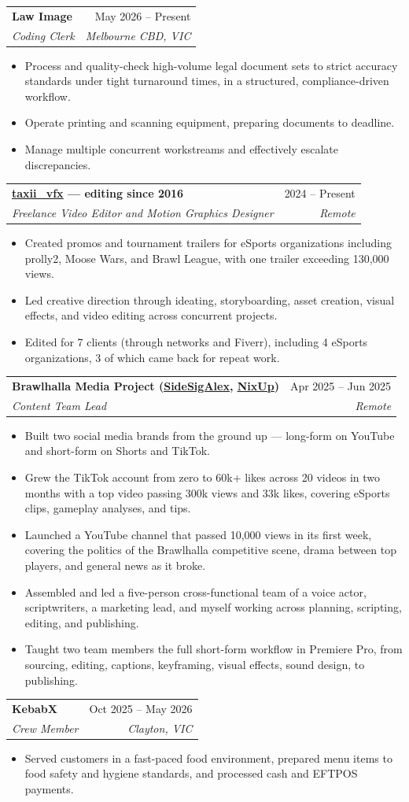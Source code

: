 \documentclass[letterpaper,11pt]{article}
\makeatletter
\newcommand{\resumeItem}[1]{\item\small{{#1 \vspace{-2pt}}}}
\newcommand{\resumeSubheading}[4]{
  \vspace{-2pt}\item
    \begin{tabular*}{0.97\textwidth}[t]{l@{\extracolsep{\fill}}r}
      \textbf{#1} & #2 \\
      \textit{\small#3} & \textit{\small #4} \\
    \end{tabular*}\vspace{-7pt}
}
\newcommand{\resumeItemListStart}{\begin{itemize}}
\newcommand{\resumeItemListEnd}{\end{itemize}\vspace{-5pt}}
\makeatother
\begin{document}
    \resumeSubheading
      {Law Image}{May 2026 -- Present}
      {Coding Clerk}{Melbourne CBD, VIC}
      \resumeItemListStart
        \resumeItem{Process and quality-check high-volume legal document sets to strict accuracy standards under tight turnaround times, in a structured, compliance-driven workflow.}
        \resumeItem{Operate printing and scanning equipment, preparing documents to deadline.}
        \resumeItem{Manage multiple concurrent workstreams and effectively escalate discrepancies.}
      \resumeItemListEnd

    \resumeSubheading
      {\href{http://x.com/taxii_vfx/all}{\underline{taxii\_vfx}} --- editing since 2016}{2024 -- Present}
      {Freelance Video Editor and Motion Graphics Designer}{Remote}
      \resumeItemListStart
        \resumeItem{Created promos and tournament trailers for eSports organizations including prolly2, Moose Wars, and Brawl League, with one trailer exceeding 130,000 views.}
        \resumeItem{Led creative direction through ideating, storyboarding, asset creation, visual effects, and video editing across concurrent projects.}
        \resumeItem{Edited for 7 clients (through networks and Fiverr), including 4 eSports organizations, 3 of which came back for repeat work.}
      \resumeItemListEnd

    \resumeSubheading
      {Brawlhalla Media Project (\href{https://www.tiktok.com/@sidesigalex}{\underline{SideSigAlex}}, \href{https://www.youtube.com/@thenixup}{\underline{NixUp}})}{Apr 2025 -- Jun 2025}
      {Content Team Lead}{Remote}
      \resumeItemListStart
        \resumeItem{Built two social media brands from the ground up --- long-form on YouTube and short-form on Shorts and TikTok.}
        \resumeItem{Grew the TikTok account from zero to 60k+ likes across 20 videos in two months with a top video passing 300k views and 33k likes, covering eSports clips, gameplay analyses, and tips.}
        \resumeItem{Launched a YouTube channel that passed 10,000 views in its first week, covering the politics of the Brawlhalla competitive scene, drama between top players, and general news as it broke.}
        \resumeItem{Assembled and led a five-person cross-functional team of a voice actor, scriptwriters, a marketing lead, and myself working across planning, scripting, editing, and publishing.}
        \resumeItem{Taught two team members the full short-form workflow in Premiere Pro, from sourcing, editing, captions, keyframing, visual effects, sound design, to publishing.}
      \resumeItemListEnd

    \resumeSubheading
      {KebabX}{Oct 2025 -- May 2026}
      {Crew Member}{Clayton, VIC}
      \resumeItemListStart
        \resumeItem{Served customers in a fast-paced food environment, prepared menu items to food safety and hygiene standards, and processed cash and EFTPOS payments.}
      \resumeItemListEnd
\end{document}
